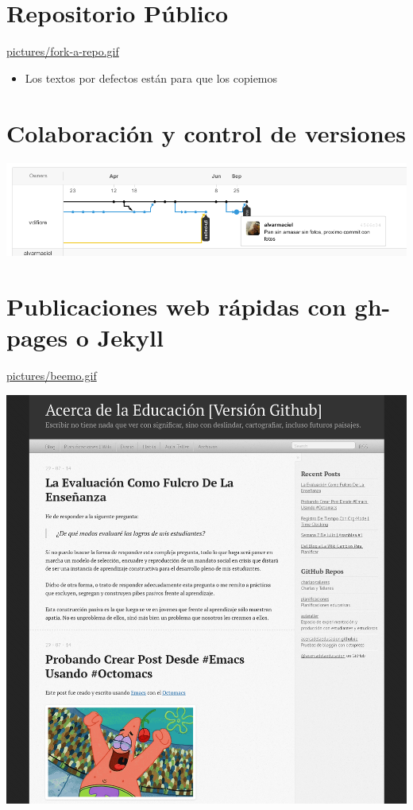 \documentclass[11pt]{article}
\begin{document}
\section{Repositorio Público}
\label{sec:orgheadline5}
\url{pictures/fork-a-repo.gif}

\begin{itemize}
\item Los textos por defectos están para que los copiemos
\end{itemize}
\section{Colaboración y control de versiones}
\label{sec:orgheadline6}
\includegraphics[width=.9\linewidth]{pictures/networkgraph.png}
\section{Publicaciones web rápidas con gh-pages o Jekyll}
\label{sec:orgheadline7}
\url{pictures/beemo.gif}

\includegraphics[width=.9\linewidth]{pictures/pagina2.png}
\end{document}
